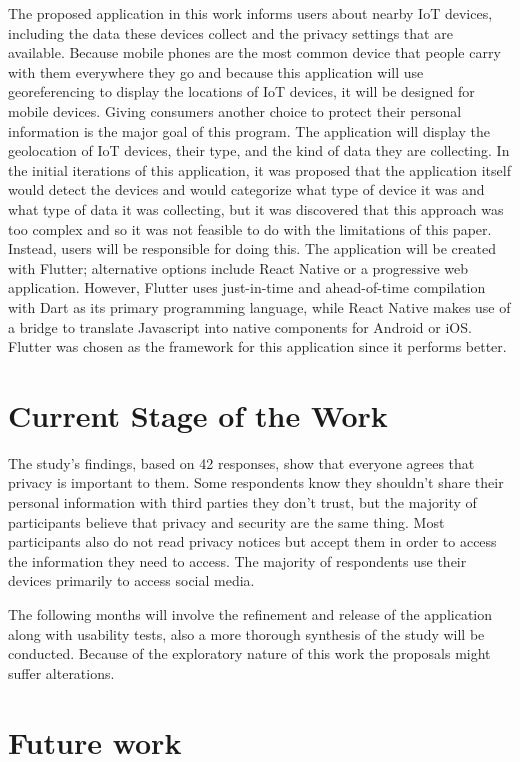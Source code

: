 \documentclass[manuscript,natbib=false]{acmart}
\begin{document}
The proposed application in this work informs users about nearby IoT devices,
including the data these devices collect and the privacy settings that are
available. Because mobile phones are the most common device that people
carry with them everywhere they go and because this application will use
georeferencing to display the locations of IoT devices, it will be designed
for mobile devices. Giving consumers another choice to protect their personal
information is the major goal of this program.
The application will display the geolocation of IoT devices, their type,
and the kind of data they are collecting. In the initial iterations of this
application, it was proposed that the application itself would detect the
devices and would categorize what type of device it was and what type of
data it was collecting, but it was discovered that this approach was too
complex and so it was not feasible to do with the limitations of this paper.
Instead, users will be responsible for doing this.
The application will be created with Flutter; alternative options include
React Native or a progressive web application. However, Flutter uses
just-in-time and ahead-of-time compilation with Dart as its primary
programming language, while React Native makes use of a bridge to translate
Javascript into native components for Android or iOS. Flutter was chosen as
the framework for this application since it performs better.

\section{Current Stage of the Work}

The study's findings, based on 42 responses, show that everyone agrees that
privacy is important to them. Some respondents know they shouldn't share their
personal information with third parties they don't trust, but the majority of
participants believe that privacy and security are the same thing. Most
participants also do not read privacy notices but accept them in order to
access the information they need to access. The majority of respondents use
their devices primarily to access social media.

The following months will involve the refinement and release of the application along with
usability tests, also a more thorough synthesis of the study will be conducted.
Because of the exploratory nature of this work the proposals might suffer alterations.

\section{Future work}
\end{document}
